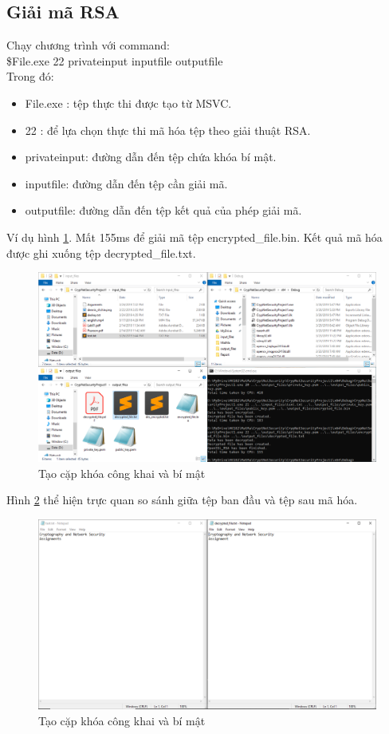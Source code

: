 \documentclass[a4paper]{article}
\begin{document}
    \subsection{Giải mã RSA}
    Chạy chương trình với command:\\
    \$File.exe 22 privateinput inputfile outputfile\\
    Trong đó:
    \begin{itemize}
        \item File.exe : tệp thực thi được tạo từ MSVC.
        \item 22 : để lựa chọn thực thi mã hóa tệp theo giải thuật RSA.
        \item privateinput: đường dẫn đến tệp chứa khóa bí mật.
        \item inputfile: đường dẫn đến tệp cần giải mã.
        \item outputfile: đường dẫn đến tệp kết quả của phép giải mã.
    \end{itemize}
    Ví dụ hình \ref{fig:rsade}. Mất 155ms để giải mã tệp encrypted\_file.bin. Kết quả mã hóa được ghi xuống tệp decrypted\_file.txt.\\
    \begin{figure}[htp]
        \centering
        \includegraphics[scale=0.4]{rsade.png}
        \caption{Tạo cặp khóa công khai và bí mật}
        \label{fig:rsade}
    \end{figure}
    Hình \ref{fig:rsacmp} thể hiện trực quan so sánh giữa tệp ban đầu và tệp sau mã hóa.
    \begin{figure}[htp]
        \centering
        \includegraphics[scale=0.4]{rsacmp.png}
        \caption{Tạo cặp khóa công khai và bí mật}
        \label{fig:rsacmp}
    \end{figure}
\end{document}
